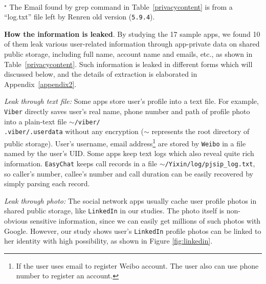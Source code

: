 \documentclass{sig-alternate}
\makeatletter
\newcommand{\tabincell}[2]{\begin{tabular}{@{}#1@{}}#2\end{tabular}}
\makeatother
\begin{document}
\begin{table}[htb]
\scalebox{0.8}{\usebox{\tableboxy}}
\\ $^{\star}$ The Email found by grep command in Table~\ref{privacycontent} is from a ``log.txt'' file left by Renren old version (\texttt{5.9.4}).
\end{table}



\noindent\textbf{How the information is leaked}. By studying the 17 sample apps, we found 10 of them leak various user-related information through app-private data on shared public storage, including full name, account name and emails, etc., as shown in Table~\ref{privacycontent}. Such information is leaked in different forms which will discussed below, and the details of extraction is elaborated in Appendix~\ref{appendix2}.

\vspace{2pt}\noindent \textit{Leak through text file:} Some apps store user's profile into a text file. For example, \texttt{Viber} directly saves user's real name, phone number and path of profile photo into a plain-text file \texttt{$\sim$/viber/\\.viber/.userdata} without any encryption ($\sim$ represents the root directory of public storage). User's username, email address\footnote{If the user uses email to register Weibo account. The user also can use phone number to register an account.} are stored by \texttt{Weibo} in a file named by the user's UID. Some apps keep text logs which also reveal quite rich information. \texttt{EasyChat} keeps call records in a file \texttt{$\sim$/Yixin/log/pjsip\_log.txt}, so caller's number, callee's number and call duration can be easily recovered by simply parsing each record.


\vspace{2pt}\noindent \textit{Leak through photo:} The social network apps usually cache user profile photos in shared public storage, like \texttt{LinkedIn} in our studies. The photo itself is non-obvious sensitive information, since we can easily get millions of such photos with Google. However, our study shows user's \texttt{LinkedIn} profile photos can be linked to her identity with high possibility, as shown in Figure \ref{fig:linkedin}.
\end{document}
